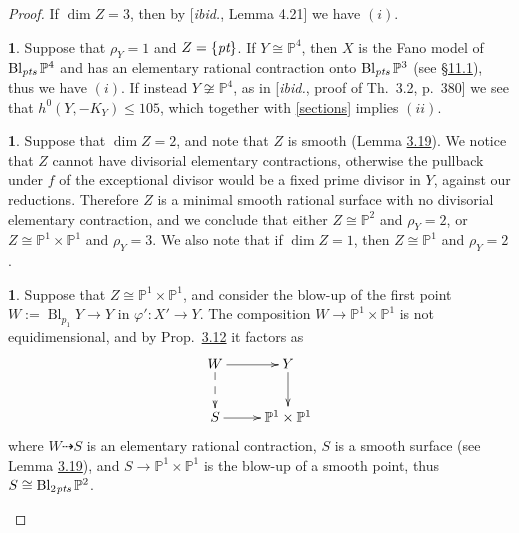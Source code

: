 \documentclass[10pt,a4paper]{amsart}
\theoremstyle{definition}
\newtheorem{prg}[thm]{}
\numberwithin{figure}{section}
\numberwithin{table}{section}
\newcommand{\ph}{\varphi}
\newcommand{\pr}{\mathbb{P}}
\newcommand{\Bl}{\operatorname{Bl}}
\newcommand{\pt}{\text{\it pt}}
\newcommand{\pts}{\text{\it pts}}
\begin{document}
\begin{proof}
   If $\dim Z=3$, then by [\emph{ibid.}, Lemma 4.21] we have $(i)$.
    \begin{prg}\label{rhoY1}
      Suppose that $\rho_Y=1$ and $Z=\{\pt\}$.
      If $Y\cong\pr^4$,
      then  $X$ is the Fano model of $\Bl_{\pts}\pr^4$ and has an elementary rational contraction onto $\Bl_{\pts}\pr^3$ (see \S\href{https://arxiv.org/abs/2508.21207v1}{11.1}), thus we have $(i)$.
      If instead $Y\not\cong\pr^4$, 
 as in [\emph{ibid.}, proof of Th.~3.2, p.~380] we see that $h^0(Y,-K_Y)\leq 105$, which together with \eqref{sections} implies $(ii)$.
\end{prg}
  \begin{prg}\label{dimZ2}
   Suppose that $\dim Z=2$, and note that $Z$ is smooth (Lemma \href{https://arxiv.org/abs/2508.21207v1}{3.19}).   
    We notice that
    $Z$ cannot have divisorial  elementary contractions, otherwise the pullback under $f$ of the exceptional divisor would be a fixed prime divisor in $Y$, against our reductions.
Therefore $Z$ is a minimal smooth rational surface  with no 
divisorial elementary contraction, and we conclude that either $Z\cong\pr^2$ and $\rho_Y=2$, or $Z\cong\pr^1\times\pr^1$ and $\rho_Y=3$. We also note that if $\dim Z=1$, then $Z\cong\pr^1$ and $\rho_Y=2$.
\end{prg}
  \begin{prg}\label{avocado}
   Suppose that $Z\cong\pr^1\times\pr^1$, and consider the blow-up
of the first point $W:=\Bl_{p_1}Y\to Y$ in $\ph'\colon X'\to Y$. The composition $W\to\pr^1\times\pr^1$ is not equidimensional, and by Prop.~\href{https://arxiv.org/abs/2508.21207v1}{3.12} it factors as
    $$\xymatrix{{W}\ar[r]\ar@{-->}[d]&Y\ar[d]\\
     S\ar[r]&{\pr^1\times\pr^1}
    }$$
    where $W\dasharrow S$ is an elementary rational contraction, $S$ is a smooth surface (see Lemma \href{https://arxiv.org/abs/2508.21207v1}{3.19}), and $S\to\pr^1\times\pr^1$ is the blow-up of a smooth point, thus $S\cong\Bl_{2\mskip1mu\pts}\pr^2$.


\end{prg}
\end{proof}
\end{document}
